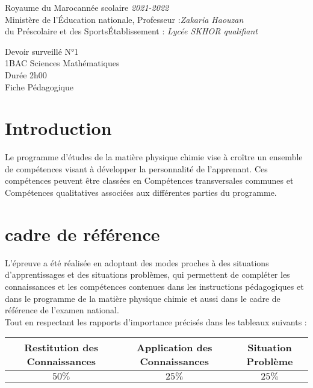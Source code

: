 \documentclass[12pt]{article}
\newcommand\headerMe[2]{\noindent{}#1\hfill#2}
\begin{document}
\headerMe{Royaume du Maroc}{année scolaire \emph{2021-2022}}\\
\headerMe{Ministère de l'Éducation nationale, }{  Professeur :\emph{Zakaria Haouzan}}\\
\headerMe{du Préscolaire et des Sports}{Établissement : \emph{Lycée SKHOR qualifiant}}\\

\begin{center}
Devoir surveillé N°1 \\
1BAC Sciences Mathématiques\\
Durée 2h00
\\
    \vspace{.2cm}
\hrulefill
\Large{Fiche Pédagogique}
\hrulefill\\
\end{center}


\section[A]{Introduction }
\hspace{0.5cm}Le programme d'études de la matière physique chimie vise à croître un ensemble de compétences visant à développer la personnalité de l'apprenant. Ces compétences peuvent être classées en Compétences transversales communes et Compétences qualitatives associées aux différentes parties du programme.
\section{cadre de référence }
 \hspace{0.5cm}L'épreuve a été réalisée en adoptant des modes proches à des situations d'apprentissages et des situations problèmes, qui permettent de compléter les connaissances et les compétences contenues dans les instructions pédagogiques et dans le programme de la matière physique chimie et aussi dans le cadre de référence de l'examen national. 
 \\Tout en respectant les rapports d'importance précisés dans les tableaux suivants :
 \begin{center}
\begin{tabular}{|c||c||c|}
\hline
    \textbf{Restitution des Connaissances} & \textbf{Application des Connaissances} & \textbf{Situation Problème }\\
    \hline
    $50\%$ & $25\%$ & $25\%$\\
    \hline
\end{tabular} 
\end{center}
\end{document}
